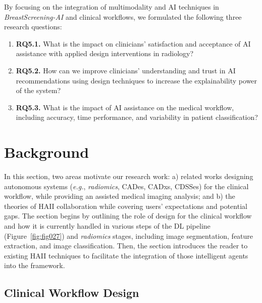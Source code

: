 \vspace{2.50mm}

\noindent
By focusing on the integration of multimodality and \ac{AI} techniques in {\it BreastScreening-AI} and clinical workflows, we formulated the following three research questions:

\vspace{0.05mm}

\begin{enumerate}
\item {\bf RQ5.1.} What is the impact on clinicians' satisfaction and acceptance of \ac{AI} assistance with applied design interventions in radiology?
\item {\bf RQ5.2.} How can we improve clinicians' understanding and trust in \ac{AI} recommendations using design techniques to increase the explainability power of the system?
\item {\bf RQ5.3.} What is the impact of \ac{AI} assistance on the medical workflow, including accuracy, time performance, and variability in patient classification?
\end{enumerate}

\section{Background}
\label{sec:chap005002}

In this section, two areas motivate our research work:
a) related works designing autonomous systems ({\it e.g.}, {\it radiomics}, \acp{CADe}, \acp{CADx}, \acp{CDSSe}) for the clinical workflow, while providing an assisted medical imaging analysis; and
b) the theories of \ac{HAII} collaboration while covering users' expectations and potential gaps.
The section begins by outlining the role of design for the clinical workflow and how it is currently handled in various steps of the \ac{DL} pipeline (Figure~\ref{fig:fig027}) and {\it radiomics} stages, including image segmentation, feature extraction, and image classification.
Then, the section introduces the reader to existing \ac{HAII} techniques to facilitate the integration of those intelligent agents into the framework.

\subsection{Clinical Workflow Design}
\label{sec:chap005002001}

